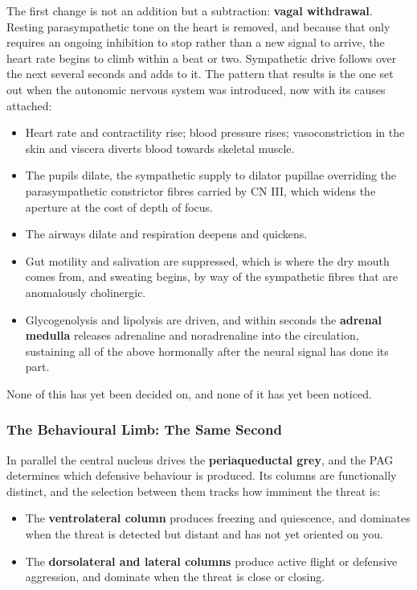 \documentclass[11pt]{article}
\begin{document}
The first change is not an addition but a subtraction: \textbf{vagal withdrawal}. Resting parasympathetic tone on the heart is removed, and because that only requires an ongoing inhibition to stop rather than a new signal to arrive, the heart rate begins to climb within a beat or two. Sympathetic drive follows over the next several seconds and adds to it. The pattern that results is the one set out when the autonomic nervous system was introduced, now with its causes attached:

\begin{itemize}
    \item Heart rate and contractility rise; blood pressure rises; vasoconstriction in the skin and viscera diverts blood towards skeletal muscle.
    \item The pupils dilate, the sympathetic supply to dilator pupillae overriding the parasympathetic constrictor fibres carried by CN III, which widens the aperture at the cost of depth of focus.
    \item The airways dilate and respiration deepens and quickens.
    \item Gut motility and salivation are suppressed, which is where the dry mouth comes from, and sweating begins, by way of the sympathetic fibres that are anomalously cholinergic.
    \item Glycogenolysis and lipolysis are driven, and within seconds the \textbf{adrenal medulla} releases adrenaline and noradrenaline into the circulation, sustaining all of the above hormonally after the neural signal has done its part.
\end{itemize}

None of this has yet been decided on, and none of it has yet been noticed.

\subsubsection{The Behavioural Limb: The Same Second}

In parallel the central nucleus drives the \textbf{periaqueductal grey}, and the PAG determines which defensive behaviour is produced. Its columns are functionally distinct, and the selection between them tracks how imminent the threat is:

\begin{itemize}
    \item The \textbf{ventrolateral column} produces freezing and quiescence, and dominates when the threat is detected but distant and has not yet oriented on you.
    \item The \textbf{dorsolateral and lateral columns} produce active flight or defensive aggression, and dominate when the threat is close or closing.
\end{itemize}
\end{document}

